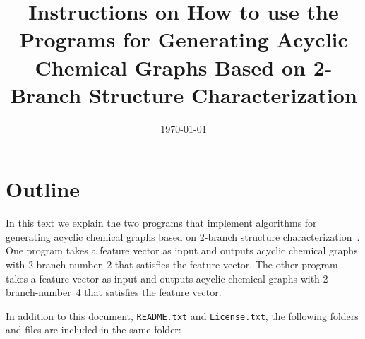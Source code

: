 \documentclass[11pt,titlepage,dvipdfmx,twoside]{article}
\title{\Huge{
Instructions on How to use the Programs for 
Generating Acyclic Chemical Graphs Based on 2-Branch Structure Characterization
}}
\begin{document}
\makeatletter 
\let\c@lstlisting\c@figure
\makeatother

\date{\today}

\maketitle


\thispagestyle{empty}
\tableofcontents
\clearpage


\section{Outline}
In this text we explain the two programs that implement
algorithms for generating acyclic chemical graphs based on 
2-branch structure characterization~\cite{branch}.
One program takes a feature vector as input and outputs acyclic chemical graphs 
with 2-branch-number~2 that satisfies the feature vector.
The other program takes a feature vector as input and outputs acyclic chemical graphs 
with 2-branch-number~4 that satisfies the feature vector.

In addition to this document, {\tt README.txt} and {\tt License.txt},
the following folders and files are included in the same folder:
\end{document}

